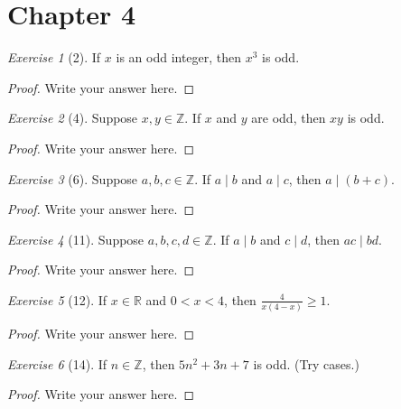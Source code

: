\documentclass[12pt]{amsart}
\theoremstyle{remark}
\newtheorem*{exercise}{Exercise}%
\def\RR{\ensuremath{\mathbb R}}
\def\ZZ{\ensuremath{\mathbb Z}}
\theoremstyle{mycomment}
\begin{document}
\thispagestyle{fancy}

\section*{Chapter 4}
\begin{exercise}[2] If $x$ is an odd integer, then $x^{3}$ is odd.
\begin{proof}
Write your answer here.
\end{proof}
\end{exercise}

\begin{exercise}[4] Suppose $x,y\in\mathbb Z$. If $x$ and $y$ are odd, then $xy$ is odd.
\begin{proof}
Write your answer here.
\end{proof}
\end{exercise}


\begin{exercise}[6] Suppose $a,b,c\in\ZZ$. If $a\mid b$ and $a\mid c$, then $a\mid (b+c)$. %
\begin{proof}
Write your answer here.
\end{proof}
\end{exercise}

\begin{exercise}[11] Suppose $a,b,c,d\in\ZZ$. If $a\mid b$ and $c\mid d$, then $ac\mid bd$.
\begin{proof}
Write your answer here.
\end{proof}
\end{exercise}
\begin{exercise}[12] If $x\in \RR$ and $0<x<4$, then $\frac{4}{x(4-x)}\ge 1$. %
\begin{proof}
Write your answer here.
\end{proof}
\end{exercise}

\begin{exercise}[14] If $n\in\ZZ$, then $5n^{2}+3n+7$ is odd. (Try cases.)
\begin{proof}
Write your answer here.
\end{proof}
\end{exercise}
\end{document}
